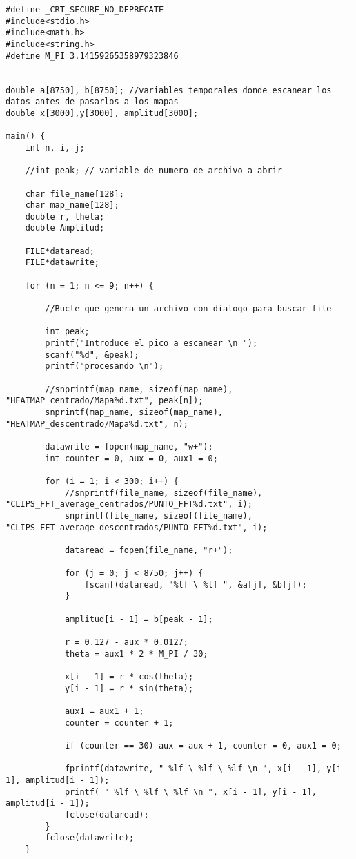 \documentclass[journal, a4paper,onecolumn]{IEEEtran}
\begin{document}
\begin{lstlisting}
#define _CRT_SECURE_NO_DEPRECATE
#include<stdio.h>
#include<math.h>
#include<string.h>
#define M_PI 3.14159265358979323846


double a[8750], b[8750]; //variables temporales donde escanear los datos antes de pasarlos a los mapas
double x[3000],y[3000], amplitud[3000];

main() {
	int n, i, j;

	//int peak; // variable de numero de archivo a abrir
	
	char file_name[128];
	char map_name[128];
	double r, theta;
	double Amplitud;
		
	FILE*dataread;
	FILE*datawrite;	
	
	for (n = 1; n <= 9; n++) {

		//Bucle que genera un archivo con dialogo para buscar file
		
		int peak;
		printf("Introduce el pico a escanear \n ");
		scanf("%d", &peak);
		printf("procesando \n");

		//snprintf(map_name, sizeof(map_name), "HEATMAP_centrado/Mapa%d.txt", peak[n]);
		snprintf(map_name, sizeof(map_name), "HEATMAP_descentrado/Mapa%d.txt", n);

		datawrite = fopen(map_name, "w+");
		int counter = 0, aux = 0, aux1 = 0;

		for (i = 1; i < 300; i++) {
			//snprintf(file_name, sizeof(file_name), "CLIPS_FFT_average_centrados/PUNTO_FFT%d.txt", i);
			snprintf(file_name, sizeof(file_name), "CLIPS_FFT_average_descentrados/PUNTO_FFT%d.txt", i);
			
			dataread = fopen(file_name, "r+");			

			for (j = 0; j < 8750; j++) {
				fscanf(dataread, "%lf \ %lf ", &a[j], &b[j]);
			}

			amplitud[i - 1] = b[peak - 1];
			
			r = 0.127 - aux * 0.0127;
			theta = aux1 * 2 * M_PI / 30;

			x[i - 1] = r * cos(theta);
			y[i - 1] = r * sin(theta);

			aux1 = aux1 + 1;
			counter = counter + 1;

			if (counter == 30) aux = aux + 1, counter = 0, aux1 = 0;

			fprintf(datawrite, " %lf \ %lf \ %lf \n ", x[i - 1], y[i - 1], amplitud[i - 1]);
			printf( " %lf \ %lf \ %lf \n ", x[i - 1], y[i - 1], amplitud[i - 1]);
			fclose(dataread);
		}
		fclose(datawrite);
	}
\end{lstlisting}
\end{document}
